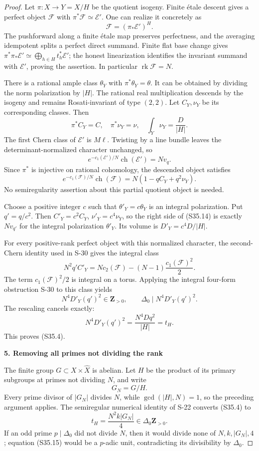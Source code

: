 \begin{proof}
Let \(\pi:X\to Y=X/H\) be the quotient isogeny. Finite étale descent gives a perfect object \(\mathcal F\) with \(\pi^*\mathcal F\simeq\mathcal E'\). One can realize it concretely as \[
 \mathcal F=(\pi_*\mathcal E')^H.
 \tag{S35.12}
\] The pushforward along a finite étale map preserves perfectness, and the averaging idempotent splits a perfect direct summand. Finite flat base change gives \(\pi^*\pi_*\mathcal E'\simeq\bigoplus_{h\in H}t_h^*\mathcal E'\); the honest linearization identifies the invariant summand with \(\mathcal E'\), proving the assertion. In particular \(\operatorname{rk}\mathcal F=N\).

There is a rational ample class \(\theta_Y\) with \(\pi^*\theta_Y=\theta\). It can be obtained by dividing the norm polarization by \(|H|\). The rational real multiplication descends by the isogeny and remains Rosati-invariant of type \((2,2)\). Let \(C_Y,\nu_Y\) be its corresponding classes. Then \[
 \pi^*C_Y=C,\quad \pi^*\nu_Y=\nu,\quad
 \int_Y\nu_Y=\frac D{|H|}.
 \tag{S35.13}
\] The first Chern class of \(\mathcal E'\) is \(M\ell\). Twisting by a line bundle leaves the determinant-normalized character unchanged, so \[
 e^{-c_1(\mathcal E')/N}\operatorname{ch}(\mathcal E')=Nv_q.
\] Since \(\pi^*\) is injective on rational cohomology, the descended object satisfies \[
 e^{-c_1(\mathcal F)/N}\operatorname{ch}(\mathcal F)
       =N(1-qC_Y+q^2\nu_Y).
 \tag{S35.14}
\] No semiregularity assertion about this partial quotient object is needed.

Choose a positive integer \(c\) such that \(\theta'_Y=c\theta_Y\) is an integral polarization. Put \(q'=q/c^2\). Then \(C'_Y=c^2C_Y\), \(\nu'_Y=c^4\nu_Y\), so the right side of (S35.14) is exactly \(Nv_{q'}\) for the integral polarization \(\theta'_Y\). Its volume is \(D'_Y=c^4D/|H|\).

For every positive-rank perfect object with this normalized character, the second-Chern identity used in S-30 gives the integral class \[
 N^2q'C'_Y
     =N c_2(\mathcal F)
        -(N-1)\frac{c_1(\mathcal F)^2}{2}.
\] The term \(c_1(\mathcal F)^2/2\) is integral on a torus. Applying the integral four-form obstruction S-30 to this class yields \[
 N^4D'_Y(q')^2\in\mathbf Z_{>0},
 \qquad \Delta_0\mid N^4D'_Y(q')^2.
\] The rescaling cancels exactly: \[
 N^4D'_Y(q')^2=\frac{N^4Dq^2}{|H|}=t_H.
\] This proves (S35.4).

\par\medskip\noindent\textbf{5. Removing all primes not dividing the rank}\quad

The finite group \(G\subset X\times\widehat X\) is abelian. Let \(H\) be the product of its primary subgroups at primes not dividing \(N\), and write \[
 G_N=G/H.
\] Every prime divisor of \(|G_N|\) divides \(N\), while \(\gcd(|H|,N)=1\), so the preceding argument applies. The semiregular numerical identity of S-22 converts (S35.4) to \[
 t_H=\frac{N^2 k |G_N|}{4}\in\Delta_0\mathbf Z_{>0}.
 \tag{S35.15}
\] If an odd prime \(p\mid\Delta_0\) did not divide \(N\), then it would divide none of \(N,k,|G_N|,4\); equation (S35.15) would be a \(p\)-adic unit, contradicting its divisibility by \(\Delta_0\).


\end{proof}

